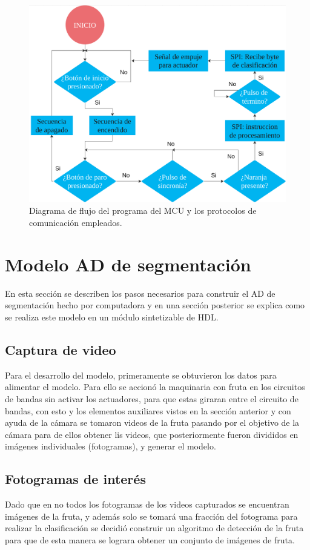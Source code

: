 \documentclass[twoside,spanish,ESP,MSc]{plantillaLabUPV}
\theoremstyle{definition}
\begin{document}
\begin{figure}
	\centering
	\includegraphics[width=0.7\linewidth]{edrawimas/MCUprog}
	\caption{Diagrama de flujo del programa del MCU y los protocolos de comunicación empleados.}
	\label{fig:mcuprog}
\end{figure}

\section{Modelo AD de segmentación} \label{sec:addsgm}

En esta sección se describen los pasos necesarios para construir el AD de segmentación hecho por computadora y en una sección posterior se explica como se realiza este modelo en un módulo sintetizable de HDL.

\subsection{Captura de video}
Para el desarrollo del modelo, primeramente se obtuvieron los datos para alimentar el modelo. Para ello se accionó la maquinaria con fruta en los circuitos de bandas sin activar los actuadores, para que estas giraran entre el circuito de bandas, con esto y los elementos auxiliares vistos en la sección anterior y con ayuda de la cámara se tomaron videos de la fruta pasando por el objetivo de la cámara para de ellos obtener lis videos, que posteriormente fueron divididos en imágenes individuales (fotogramas), y generar el modelo.

\subsection{Fotogramas de interés}
Dado que en no todos los fotogramas de los videos capturados se encuentran imágenes de la fruta, y además solo se tomará una fracción del fotograma para realizar la clasificación se decidió construir un algoritmo de detección de la fruta para que de esta manera se lograra obtener un conjunto de imágenes de fruta. 
\end{document}
